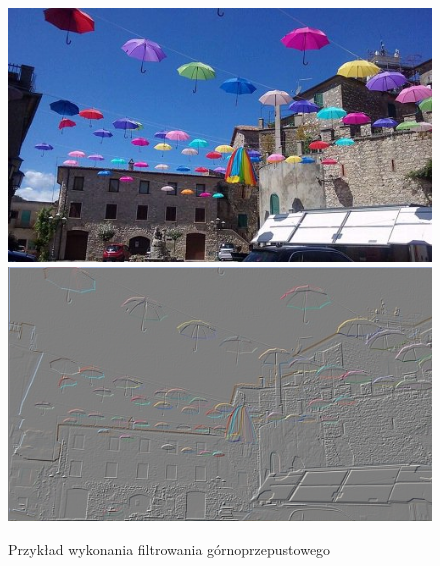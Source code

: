 \documentclass{article}
\begin{document}
\begin{figure}[!ht]
	\includegraphics[scale=1.2]{img/rgb-obraz1}
	\includegraphics[scale=1.2]{img/filtrowanie/rgb-gornoprzepustowe-robertsa}
	\caption{Przykład wykonania filtrowania górnoprzepustowego}
	\label{fig24}	
	\end{figure}	
	
	
\end{document}
